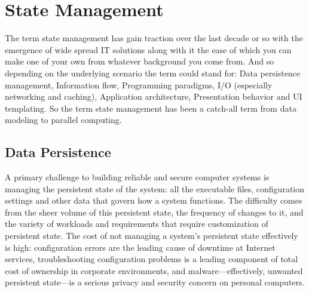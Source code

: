 \documentclass[12pt,twoside]{article}
\begin{document}
\section{State Management}
The term state management has gain traction over the last decade or so with the emergence of wide spread IT solutions along with it the ease of which you can make one of your own from whatever background you come from. And so depending on the underlying scenario the term could stand for:
Data persistence management,
Information flow,
Programming paradigms,
I/O (especially networking and caching), %
Application architecture,
Presentation behavior and 
UI templating. So the term state management has been a catch-all term from data modeling to parallel computing. 

\subsection{Data Persistence}

A primary challenge to building reliable and secure computer systems is managing the persistent state of the system: all the executable files, configuration settings and other data that govern how a system functions. The difficulty comes from the sheer volume of this persistent state, the frequency of changes to it, and the variety of workloads and requirements that require customization of persistent state. The cost of not managing a system's persistent state effectively is high: configuration errors are the leading cause of downtime at Internet services, troubleshooting configuration problems is a leading component of total cost of ownership in corporate environments, and malware—effectively, unwanted persistent state—is a serious privacy and security concern on personal computers.
\end{document}

